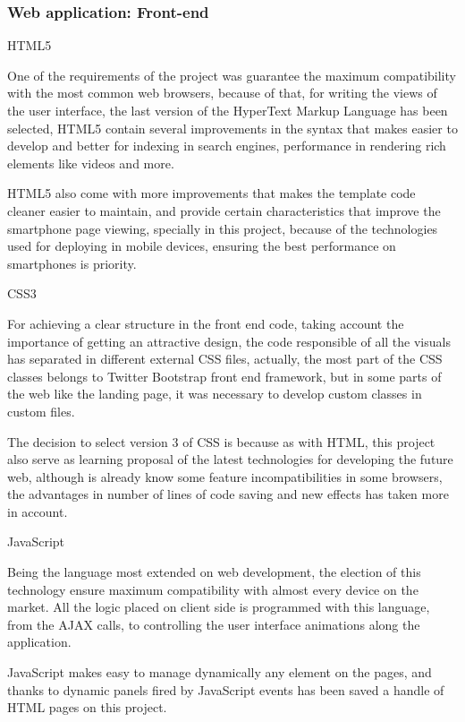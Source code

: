 \documentclass{DeustoFDP}
\begin{document}
\subsubsection{Web application: Front-end}
{\large HTML5}

One of the requirements of the project was guarantee the maximum compatibility with the most common web browsers, because of that, for writing the views of the user interface, the last version of the HyperText Markup Language has been selected, HTML5 contain several improvements in the syntax that makes easier to develop and better for indexing in search engines, performance in rendering rich elements like videos and more.

HTML5 also come with more improvements that makes the template code cleaner easier to maintain, and provide certain characteristics that improve the smartphone page viewing, specially in this project, because of the technologies used for deploying in mobile devices, ensuring the best performance on smartphones is priority.

{\large CSS3}

For achieving a clear structure in the front end code, taking account the importance of getting an attractive design, the code responsible of all the visuals has separated in different external CSS files, actually, the most part of the CSS classes belongs to Twitter Bootstrap front end framework, but in some parts of the web like the landing page, it was necessary to develop custom classes in custom files.

The decision to select version 3 of CSS is because as with HTML, this project also serve as learning proposal of the latest technologies for developing the future web, although is already know some feature incompatibilities in some browsers, the advantages in number of lines of code saving and new effects has taken more in account.

{\large JavaScript}

Being the language most extended on web development, the election of this technology ensure maximum compatibility with almost every device on the market. All the logic placed on client side is programmed with this language, from the AJAX calls, to controlling the user interface animations along the application.

JavaScript makes easy to manage dynamically any element on the pages, and thanks to dynamic panels fired by JavaScript events has been saved a handle of HTML pages on this project.
\end{document}
